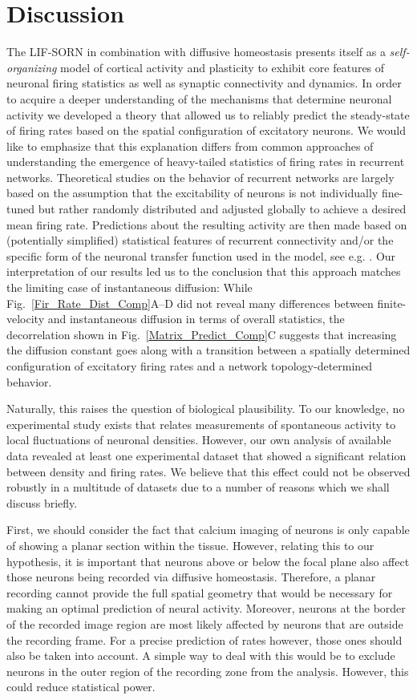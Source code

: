 \documentclass[10pt,letterpaper]{article}
\begin{document}
\section*{Discussion}
The LIF-SORN in combination with diffusive homeostasis presents itself as a \emph{self-organizing} model of cortical activity and plasticity to exhibit core features of neuronal firing statistics as well as synaptic connectivity and dynamics. In order to acquire a deeper understanding of the mechanisms that determine neuronal activity we developed a theory that allowed us to reliably predict the steady-state of firing rates based on the spatial configuration of excitatory neurons. We would like to emphasize that this explanation differs from common approaches of understanding the emergence of heavy-tailed statistics of firing rates in recurrent networks. Theoretical studies on the behavior of recurrent networks are largely based on the assumption that the excitability of neurons is not individually fine-tuned but rather randomly distributed and adjusted globally to achieve a desired mean firing rate. Predictions about the resulting activity are then made based on (potentially simplified) statistical features of recurrent connectivity and/or the specific form of the neuronal transfer function used in the model, see e.g. \cite{Roxin_Firing_Rate_Distribution,Vreeswijk1998,Koulakov_2009}. Our interpretation of our results led us to the conclusion that this approach matches the limiting case of instantaneous diffusion: While Fig.~\ref{Fir_Rate_Dist_Comp}A--D did not reveal many differences between finite-velocity and instantaneous diffusion in terms of overall statistics, the decorrelation shown in Fig.~\ref{Matrix_Predict_Comp}C suggests that increasing the diffusion constant goes along with a transition between a spatially determined configuration of excitatory firing rates and a network topology-determined behavior.

Naturally, this raises the question of biological plausibility. To our knowledge, no experimental study exists that relates measurements of spontaneous activity to local fluctuations of neuronal densities. However, our own analysis of available data revealed at least one experimental dataset that showed a significant relation between density and firing rates. We believe that this effect could not be observed robustly in a multitude of datasets due to a number of reasons which we shall discuss briefly.

First, we should consider the fact that calcium imaging of neurons is only capable of showing a planar section within the tissue. However, relating this to our hypothesis, it is important that neurons above or below the focal plane also affect those neurons being recorded via diffusive homeostasis. Therefore, a planar recording cannot provide the full spatial geometry that would be necessary for making an optimal prediction of neural activity. Moreover, neurons at the border of the recorded image region are most likely affected by neurons that are outside the recording frame. For a precise prediction of rates however, those ones should also be taken into account. A simple way to deal with this would be to exclude neurons in the outer region of the recording zone from the analysis. However, this could reduce statistical power.
\end{document}
